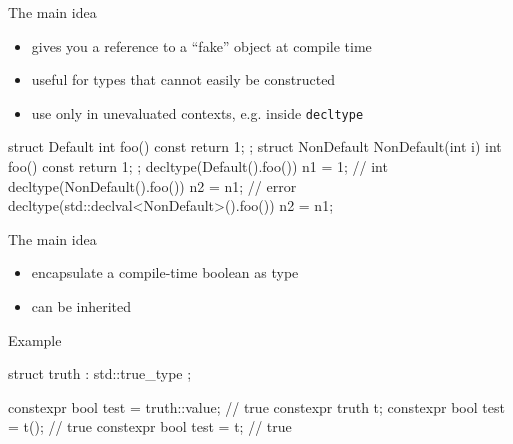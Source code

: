 \begin{frame}[fragile]
  \begin{block}{The main idea}
    \begin{itemize}
    \item gives you a reference to a ``fake'' object at compile time
    \item useful for types that cannot easily be constructed
    \item use only in unevaluated contexts, e.g. inside \texttt{decltype}
    \end{itemize}
  \end{block}
  \begin{exampleblock}{}
    \begin{cppcode*}{}
      struct Default {
        int foo() const { return 1; }
      };
      struct NonDefault {
        NonDefault(int i) { }
        int foo() const { return 1; }
      };
      decltype(Default().foo()) n1 = 1;     // int
      decltype(NonDefault().foo()) n2 = n1; // error
      decltype(std::declval<NonDefault>().foo()) n2 = n1;
    \end{cppcode*}
  \end{exampleblock}
\end{frame}

\begin{frame}[fragile]
  \begin{block}{The main idea}
    \begin{itemize}
    \item encapsulate a compile-time boolean as type
    \item can be inherited
    \end{itemize}
  \end{block}
  \begin{exampleblock}{Example}
    \begin{cppcode*}{}
      struct truth : std::true_type { };

      constexpr bool test = truth::value; // true
      constexpr truth t;
      constexpr bool test = t(); // true
      constexpr bool test = t;   // true
    \end{cppcode*}
  \end{exampleblock}
\end{frame}

